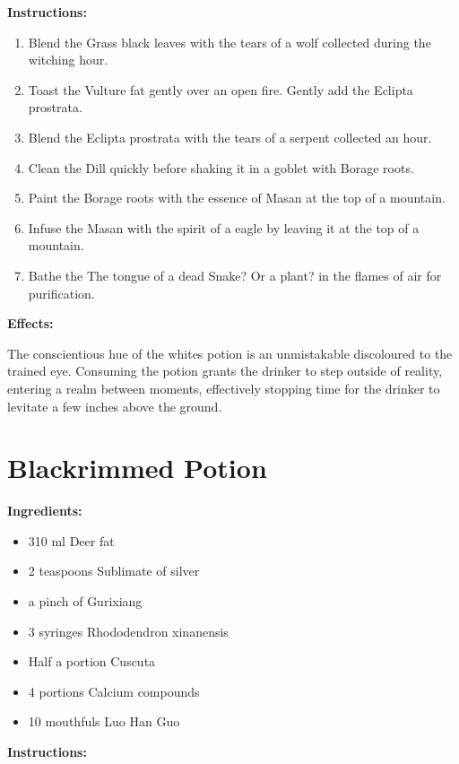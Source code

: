 \documentclass{article}
\begin{document}
\textbf{Instructions:}

\begin{enumerate}
  \item Blend the Grass black leaves with the tears of a wolf collected during the witching hour.
  \item Toast the Vulture fat gently over an open fire. Gently add the Eclipta prostrata.
  \item Blend the Eclipta prostrata with the tears of a serpent collected an hour.
  \item Clean the Dill quickly before shaking it in a goblet with Borage roots.
  \item Paint the Borage roots with the essence of Masan at the top of a mountain.
  \item Infuse the Masan with the spirit of a eagle by leaving it at the top of a mountain.
  \item Bathe the The tongue of a dead Snake? Or a plant? in the flames of air for purification.
\end{enumerate}

\textbf{Effects:}

The conscientious hue of the whites potion is an unmistakable discoloured to the trained eye. Consuming the potion grants the drinker to step outside of reality, entering a realm between moments, effectively stopping time for the drinker to levitate a few inches above the ground.

\newpage
\section*{Blackrimmed Potion}

\textbf{Ingredients:}

\begin{itemize}
  \item 310 ml Deer fat
  \item 2 teaspoons Sublimate of silver
  \item a pinch of Gurixiang
  \item 3 syringes Rhododendron xinanensis
  \item Half a portion Cuscuta
  \item 4 portions Calcium compounds
  \item 10 mouthfuls Luo Han Guo
\end{itemize}

\textbf{Instructions:}
\end{document}
